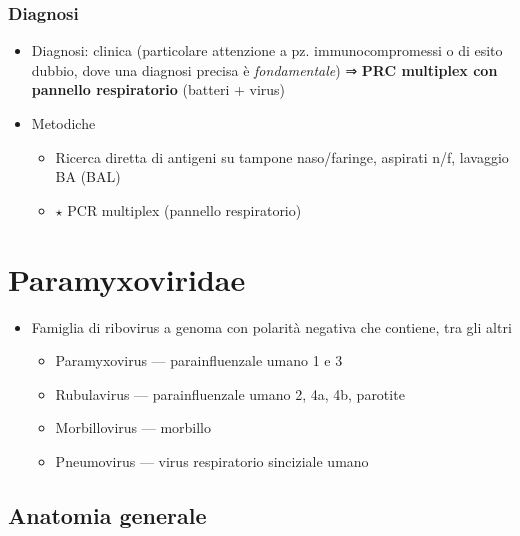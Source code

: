 \documentclass[italian,]{article}
\providecommand{\tightlist}{%
  \setlength{\itemsep}{0pt}\setlength{\parskip}{0pt}}
\newcommand{\goldstandard}{\textcircled{$\star$} }                      %
\begin{document}
\hypertarget{diagnosi-12}{%
\subsubsection{Diagnosi}\label{diagnosi-12}}

\begin{itemize}
\tightlist
\item
  Diagnosi: clinica (particolare attenzione a pz. immunocompromessi o di
  esito dubbio, dove una diagnosi precisa è \emph{fondamentale}) ⇒
  \textbf{PRC multiplex con pannello respiratorio} (batteri + virus)
\item
  Metodiche

  \begin{itemize}
  \tightlist
  \item
    Ricerca diretta di antigeni su tampone naso/faringe, aspirati n/f,
    lavaggio BA (BAL)
  \item
    \goldstandard PCR multiplex (pannello respiratorio)
  \end{itemize}
\end{itemize}

\hypertarget{paramyxoviridae}{%
\section{Paramyxoviridae}\label{paramyxoviridae}}

\begin{itemize}
\tightlist
\item
  Famiglia di ribovirus a genoma con polarità negativa che contiene, tra
  gli altri

  \begin{itemize}
  \tightlist
  \item
    Paramyxovirus --- parainfluenzale umano 1 e 3
  \item
    Rubulavirus --- parainfluenzale umano 2, 4a, 4b, parotite
  \item
    Morbillovirus --- morbillo
  \item
    Pneumovirus --- virus respiratorio sinciziale umano
  \end{itemize}
\end{itemize}

\hypertarget{anatomia-generale}{%
\subsection{Anatomia generale}\label{anatomia-generale}}
\end{document}
